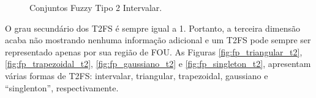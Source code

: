 \documentclass[tcc,capa]{texufpel}
\begin{document}
\begin{figure}[h]
\caption{Conjuntos Fuzzy Tipo 2 Intervalar.}\label{fig:cf_tipo_intervalar2}
\end{figure}

O grau secundário dos T2FS é sempre igual a 1. Portanto, a terceira dimensão acaba não mostrando nenhuma informação adicional e um T2FS pode sempre ser representado apenas por sua região de FOU. As Figuras \ref{fig:fp_triangular_t2}, \ref{fig:fp_trapezoidal_t2}, \ref{fig:fp_gaussiano_t2} e \ref{fig:fp_singleton_t2}, apresentam várias formas de T2FS: intervalar, triangular, trapezoidal, gaussiano e ``singlenton'', respectivamente. 
\end{document}
